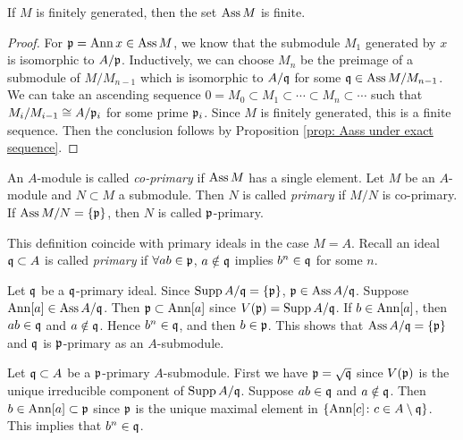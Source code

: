     \begin{corollary}\label{cor: Ass is finite}
        If $M$ is finitely generated, then the set $\operatorname{Ass} M$ is finite.
    \end{corollary}
    \begin{proof}
        For ${\mathfrak{p}} = \operatorname{Ann} x \in \operatorname{Ass} M$, we know that the submodule $M_1$ generated by $x$ is isomorphic to $A/{\mathfrak{p}}$.
        Inductively, we can choose $M_n$ be the preimage of a submodule of $M/M_{n-1}$ which is isomorphic to $A/{\mathfrak{q}}$ for some ${\mathfrak{q}} \in \operatorname{Ass} M/M_{n-1}$.
        We can take an ascending sequence $0 = M_0 \subset M_1 \subset \cdots \subset M_n \subset \cdots$ such that $M_i/M_{i-1} \cong A/{\mathfrak{p}}_i$ for some prime ${\mathfrak{p}}_i$.
        Since $M$ is finitely generated, this is a finite sequence.
        Then the conclusion follows by Proposition \ref{prop: Aass under exact sequence}.
    \end{proof}

    \begin{definition}\label{def: co-primary and primary}
        An $A$-module is called \textit{co-primary} if $\operatorname{Ass} M$ has a single element.
        Let $M$ be an $A$-module and $N \subset M$ a submodule.
        Then $N$ is called \textit{primary} if $M/N$ is co-primary.
        If $\operatorname{Ass} M/N = \{{\mathfrak{p}}\}$, then $N$ is called ${\mathfrak{p}}$-primary.
    \end{definition}

    \begin{remark}\label{rem: primary submodule and primary ideal}
        This definition coincide with primary ideals in the case $M = A$.
        Recall an ideal ${\mathfrak{q}} \subset A$ is called \textit{primary} if $\forall ab \in {\mathfrak{p}}$, 
        $a \notin {\mathfrak{q}}$ implies $b^n \in {\mathfrak{q}}$ for some $n$. 
        
        Let ${\mathfrak{q}}$ be a ${\mathfrak{q}}$-primary ideal.
        Since $\operatorname{Supp} A/{\mathfrak{q}} = \{{\mathfrak{p}}\}$, ${\mathfrak{p}} \in \operatorname{Ass} A/{\mathfrak{q}}$.
        Suppose $\operatorname{Ann} [a] \in \operatorname{Ass} A/{\mathfrak{q}}$.
        Then ${\mathfrak{p}} \subset \operatorname{Ann} [a]$ since $V({\mathfrak{p}}) = \operatorname{Supp} A/{\mathfrak{q}}$.
        If $b \in \operatorname{Ann} [a]$, then $ab \in {\mathfrak{q}}$ and $a\notin {\mathfrak{q}}$.
        Hence $b^n \in {\mathfrak{q}}$, and then $b \in {\mathfrak{p}}$.
        This shows that $\operatorname{Ass} A/{\mathfrak{q}} = \{{\mathfrak{p}}\}$ and ${\mathfrak{q}}$ is ${\mathfrak{p}}$-primary as an $A$-submodule. 

        Let ${\mathfrak{q}} \subset A$ be a ${\mathfrak{p}}$-primary $A$-submodule.
        First we have ${\mathfrak{p}} = \sqrt{{\mathfrak{q}}}$ since $V({\mathfrak{p}})$ is the unique irreducible component of $\operatorname{Supp} A/{\mathfrak{q}}$.
        Suppose $ab \in {\mathfrak{q}}$ and $a\notin {\mathfrak{q}}$.
        Then $b \in \operatorname{Ann} [a] \subset {\mathfrak{p}}$ since ${\mathfrak{p}}$ is the unique maximal element in $\{ \operatorname{Ann} [c] \colon c \in A \setminus {\mathfrak{q}}\}$.
        This implies that $b^n \in {\mathfrak{q}}$.
    \end{remark}

